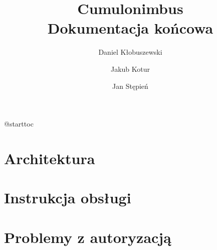 

\usepackage{microtype}


\def\cb{Cumulonimbus}
\def\todo{\textbf{TODO}: }

\title{\cb{} \\ Dokumentacja końcowa}
\author{Daniel Kłobuszewski \and Jakub Kotur \and Jan Stępień}



\maketitle
\csname @starttoc

\section{Architektura}


\section{Instrukcja obsługi}


\section{Problemy z autoryzacją}






